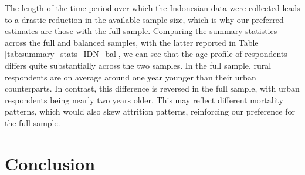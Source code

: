 \documentclass[12pt]{article}
\begin{document}
The length of the time period over which the Indonesian data were collected leads to a drastic reduction in the available sample size, which is why our preferred estimates are those with the full sample. 
Comparing the summary statistics across the full and balanced samples, with the latter reported in Table \ref{tab:summary_stats_IDN_bal}, we can see that the age profile of respondents differs quite substantially across the two samples.
In the full sample, rural respondents are on average around one year younger than their urban counterparts. 
In contrast, this difference is reversed in the full sample, with urban respondents being nearly two years older. 
This may reflect different mortality patterns, which would also skew attrition patterns, reinforcing our preference for the full sample. 









\FloatBarrier
\section{Conclusion}\label{sec:conclusion}
\end{document}
